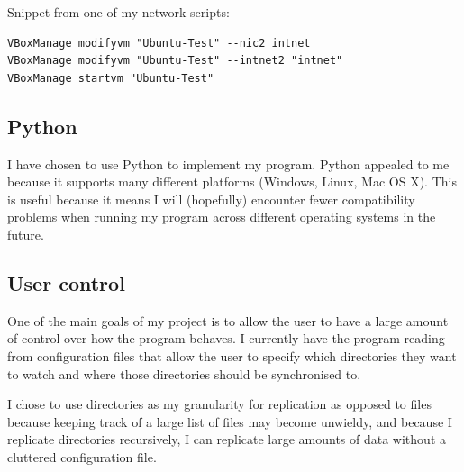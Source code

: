 \documentclass[12pt]{article}
\begin{document}
Snippet from one of my network scripts:
\begin{verbatim}
VBoxManage modifyvm "Ubuntu-Test" --nic2 intnet
VBoxManage modifyvm "Ubuntu-Test" --intnet2 "intnet"
VBoxManage startvm "Ubuntu-Test"
\end{verbatim}

\subsection{Python}
I have chosen to use Python to implement
my program. Python appealed to me because it
supports many different platforms (Windows, Linux, Mac OS X).
This is useful because it means I will (hopefully)
encounter fewer compatibility problems when running
my program across different operating systems in the future.


\subsection{User control}
One of the main goals of my project is to allow the user
to have a  large amount of control over how the program
behaves. I currently have the program reading from
configuration files that allow the user to specify
which directories they want to watch and where those
directories should be synchronised to.

I chose to use directories as my granularity for replication
as opposed to files because keeping track of a large list
of files may become unwieldy,
and because I replicate
directories recursively, I can replicate large amounts
of data without a cluttered configuration file.
\end{document}
